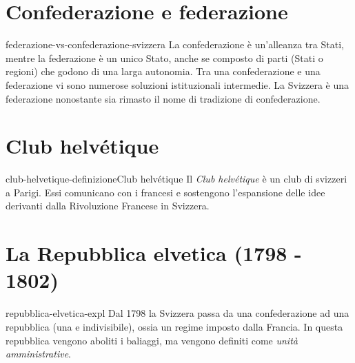 \documentclass[preview]{standalone}
\begin{document}
\section{Confederazione e federazione}

\begin{snippet}{federazione-vs-confederazione-svizzera}
    La confederazione è un'alleanza tra Stati, mentre la federazione è un unico Stato,
    anche se composto di parti (Stati o regioni) che godono di una larga autonomia.
    Tra una confederazione e una federazione vi sono numerose soluzioni istituzionali intermedie.
    La Svizzera è una federazione nonostante sia rimasto il nome di tradizione di confederazione.
\end{snippet}

\section{Club helvétique}

\begin{snippetdefinition}{club-helvetique-definizione}{Club helvétique}
    Il \textit{Club helvétique} è un club di svizzeri a Parigi.
    Essi comunicano con i francesi e sostengono l'espansione delle idee derivanti dalla Rivoluzione Francese
    in Svizzera.
\end{snippetdefinition}

\section{La Repubblica elvetica (1798 - 1802)}

\begin{snippet}{repubblica-elvetica-expl}
    Dal 1798 la Svizzera passa da una confederazione ad una repubblica (una e indivisibile),
    ossia un regime imposto dalla Francia.
    In questa repubblica vengono aboliti i baliaggi, ma vengono definiti come \textit{unità amministrative}.
\end{snippet}

\end{document}
